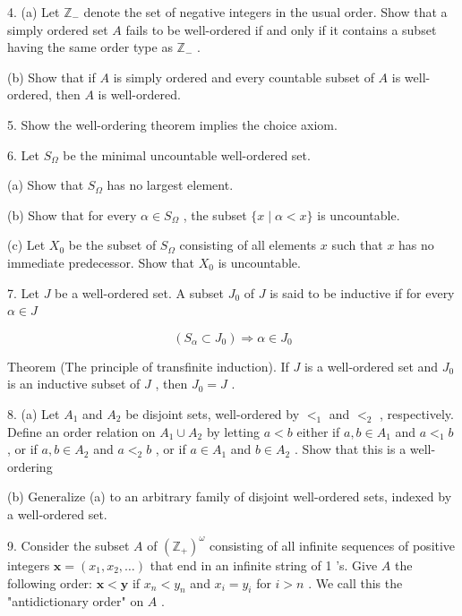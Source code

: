 \documentclass[10pt]{article}
\begin{document}
4. (a) Let \({\mathbb{Z}}_{ - }\) denote the set of negative integers in the usual order. Show that a simply ordered set \(A\) fails to be well-ordered if and only if it contains a subset having the same order type as \({\mathbb{Z}}_{ - }\) .

(b) Show that if \(A\) is simply ordered and every countable subset of \(A\) is well-ordered, then \(A\) is well-ordered.

5. Show the well-ordering theorem implies the choice axiom.

6. Let \({S}_{\Omega }\) be the minimal uncountable well-ordered set.

(a) Show that \({S}_{\Omega }\) has no largest element.

(b) Show that for every \(\alpha  \in  {S}_{\Omega }\) , the subset \(\{ x \mid  \alpha  < x\}\) is uncountable.

(c) Let \({X}_{0}\) be the subset of \({S}_{\Omega }\) consisting of all elements \(x\) such that \(x\) has no immediate predecessor. Show that \({X}_{0}\) is uncountable.

7. Let \(J\) be a well-ordered set. A subset \({J}_{0}\) of \(J\) is said to be inductive if for every \(\alpha  \in  J\)

\[
\left( {{S}_{\alpha } \subset  {J}_{0}}\right)  \Rightarrow  \alpha  \in  {J}_{0}
\]

Theorem (The principle of transfinite induction). If \(J\) is a well-ordered set and \({J}_{0}\) is an inductive subset of \(J\) , then \({J}_{0} = J\) .

8. (a) Let \({A}_{1}\) and \({A}_{2}\) be disjoint sets, well-ordered by \({ < }_{1}\) and \({ < }_{2}\) , respectively. Define an order relation on \({A}_{1} \cup  {A}_{2}\) by letting \(a < b\) either if \(a,b \in  {A}_{1}\) and \(a{ < }_{1}b\) , or if \(a,b \in  {A}_{2}\) and \(a{ < }_{2}b\) , or if \(a \in  {A}_{1}\) and \(b \in  {A}_{2}\) . Show that this is a well-ordering

(b) Generalize (a) to an arbitrary family of disjoint well-ordered sets, indexed by a well-ordered set.

9. Consider the subset \(A\) of \({\left( {\mathbb{Z}}_{ + }\right) }^{\omega }\) consisting of all infinite sequences of positive integers \(\mathbf{x} = \left( {{x}_{1},{x}_{2},\ldots }\right)\) that end in an infinite string of 1 ’s. Give \(A\) the following order: \(\mathbf{x} < \mathbf{y}\) if \({x}_{n} < {y}_{n}\) and \({x}_{i} = {y}_{i}\) for \(i > n\) . We call this the "antidictionary order" on \(A\) .
\end{document}
